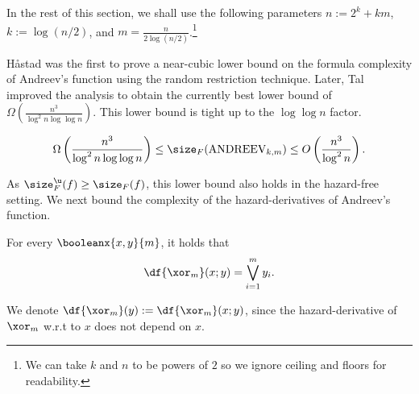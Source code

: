 \documentclass[acmsmall, nonacm, authorversion]{acmart}
\begin{document}
In the rest of this section, we shall use the following parameters $n:=2^k+km$, 
$k:=\log(n/2)$, and $m=\frac{n}{2\log(n/2)}$.\footnote{We can take $k$ and $n$ to be powers of $2$ so we ignore ceiling and floors for readability.} 

H{\aa}stad was the first to prove a near-cubic lower bound on the formula complexity of Andreev's function \cite{Has98} using the random restriction technique. Later, Tal \cite{Tal14} improved the analysis to obtain the currently best lower bound of $\Omega\left(\frac{n^3}{\log^2n\log\log n}\right)$. This lower bound is tight up to the $\log \log n$ factor.

\begin{theorem}\label{thm:andreev-lower-bound}
\[
\Omega\left(\frac{n^3}{\log^2n\log\log n}\right)\le \size_F(\text{ANDREEV}_{k,m})\leq O\left(\frac{n^3}{\log^2n}\right).
\]
\end{theorem}

As $\size_F^\u(f)\ge \size_F(f)$, this lower bound also holds in the hazard-free setting. We next bound the complexity of the hazard-derivatives of Andreev's function.

\begin{fact}\label{fact:parity-der}
For every $\booleanx{x,y}{m}$, it holds that 
\[
\df{\xor_m}(x;y)=\bigvee_{i=1}^{m}y_i.
\]
\end{fact}

We denote $\df{\xor_m}(y):=\df{\xor_m}(x;y)$, since the hazard-derivative of $\xor_m$ w.r.t to $x$ does not depend on $x$.
\end{document}
